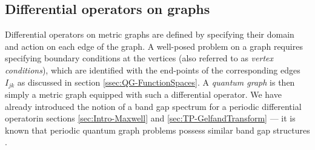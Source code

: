\subsection{Differential operators on graphs} \label{ssec:DiffOpsOnGraphs}
Differential operators on metric graphs are defined by specifying their domain and action on each edge of the graph.
A well-posed problem on a graph requires specifying boundary conditions at the vertices (also referred to as \emph{vertex conditions}), which are identified with the end-points of the corresponding edges $I_{jk}$ as discussed in section \ref{ssec:QG-FunctionSpaces}.
A \emph{quantum graph} is then simply a metric graph equipped with such a differential operator.
We have already introduced the notion of a band gap spectrum for a periodic differential operatorin sections \ref{sec:Intro-Maxwell} and \ref{sec:TP-GelfandTransform} --- it is known that periodic quantum graph problems possess similar band gap structures \cite[Chapter 4.3]{berkolaiko2013introduction}.

